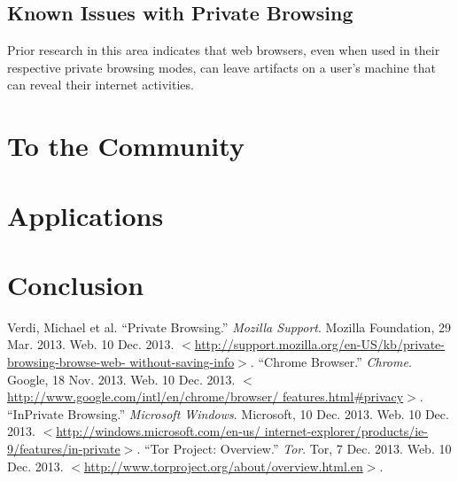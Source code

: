 \documentclass[pdftex,letterpaper,12pt]{article}
\begin{document}
    \subsection{Known Issues with Private Browsing}
    Prior research in this area indicates that web browsers, even when used in
    their respective private browsing modes, can leave artifacts on a user's
    machine that can reveal their internet activities. %

  \section{To the Community}

  \section{Applications}

  \section{Conclusion}

  \singlespacing
  \begin{thebibliography}{9}
      Verdi, Michael et al. ``Private Browsing.'' \emph{Mozilla Support}. 
      Mozilla Foundation, 29 Mar. 2013. Web. 10 Dec. 2013. 
      $<$\url{http://support.mozilla.org/en-US/kb/private-browsing-browse-web-
      without-saving-info}$>$.
      ``Chrome Browser.'' \emph{Chrome}. Google, 18 Nov. 2013. Web. 10 Dec. 
      2013. $<$\url{http://www.google.com/intl/en/chrome/browser/
      features.html#privacy}$>$.
      ``InPrivate Browsing.'' \emph{Microsoft Windows}. Microsoft, 10 Dec. 
      2013. Web. 10 Dec. 2013. $<$\url{http://windows.microsoft.com/en-us/
      internet-explorer/products/ie-9/features/in-private}$>$.
      ``Tor Project: Overview.'' \emph{Tor}. Tor, 7 Dec. 2013. Web. 10 Dec. 
      2013. $<$\url{http://www.torproject.org/about/overview.html.en}$>$. 

  \end{thebibliography}
\end{document}
